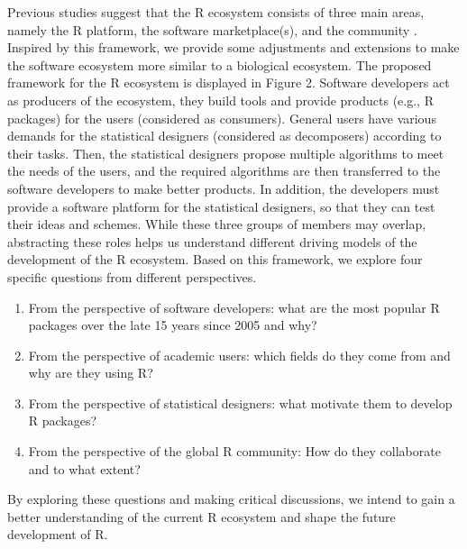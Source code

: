 Previous studies suggest that the R ecosystem consists of three main
areas, namely the R platform, the software marketplace(s), and the
community \citep{PlakidasSchall-561}. Inspired by this framework, we
provide some adjustments and extensions to make the software ecosystem
more similar to a biological ecosystem. The proposed framework for the R
ecosystem is displayed in Figure 2. Software developers act as producers
of the ecosystem, they build tools and provide products (e.g., R
packages) for the users (considered as consumers). General users have
various demands for the statistical designers (considered as
decomposers) according to their tasks. Then, the statistical designers
propose multiple algorithms to meet the needs of the users, and the
required algorithms are then transferred to the software developers to
make better products. In addition, the developers must provide a
software platform for the statistical designers, so that they can test
their ideas and schemes. While these three groups of members may
overlap, abstracting these roles helps us understand different driving
models of the development of the R ecosystem. Based on this framework,
we explore four specific questions from different perspectives.

\begin{enumerate}
\def\labelenumi{\arabic{enumi}.}
\tightlist
\item
  From the perspective of software developers: what are the most popular
  R packages over the late 15 years since 2005 and why?
\item
  From the perspective of academic users: which fields do they come from
  and why are they using R?
\item
  From the perspective of statistical designers: what motivate them to
  develop R packages?
\item
  From the perspective of the global R community: How do they
  collaborate and to what extent?
\end{enumerate}

By exploring these questions and making critical discussions, we intend
to gain a better understanding of the current R ecosystem and shape the
future development of R.

